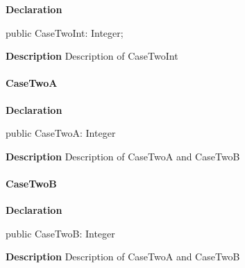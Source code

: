 \documentclass{report}
\begin{document}
\begin{list}{}{
\setlength{\itemindent}{0cm}
\setlength{\listparindent}{0cm}
\setlength{\leftmargin}{\evensidemargin}
\addtolength{\leftmargin}{\tmplength}
\settowidth{\labelsep}{X}
\addtolength{\leftmargin}{\labelsep}
\setlength{\labelwidth}{\tmplength}
}
\begin{flushleft}
\item[\textbf{Declaration}\hfill]
\begin{ttfamily}
public CaseTwoInt: Integer;\end{ttfamily}


\end{flushleft}
\par
\item[\textbf{Description}]
Description of CaseTwoInt

\end{list}
\paragraph*{CaseTwoA}\hspace*{\fill}

\begin{list}{}{
\setlength{\itemindent}{0cm}
\setlength{\listparindent}{0cm}
\setlength{\leftmargin}{\evensidemargin}
\addtolength{\leftmargin}{\tmplength}
\settowidth{\labelsep}{X}
\addtolength{\leftmargin}{\labelsep}
\setlength{\labelwidth}{\tmplength}
}
\begin{flushleft}
\item[\textbf{Declaration}\hfill]
\begin{ttfamily}
public CaseTwoA: Integer\end{ttfamily}


\end{flushleft}
\par
\item[\textbf{Description}]
Description of CaseTwoA and CaseTwoB

\end{list}
\paragraph*{CaseTwoB}\hspace*{\fill}

\begin{list}{}{
\setlength{\itemindent}{0cm}
\setlength{\listparindent}{0cm}
\setlength{\leftmargin}{\evensidemargin}
\addtolength{\leftmargin}{\tmplength}
\settowidth{\labelsep}{X}
\addtolength{\leftmargin}{\labelsep}
\setlength{\labelwidth}{\tmplength}
}
\begin{flushleft}
\item[\textbf{Declaration}\hfill]
\begin{ttfamily}
public CaseTwoB: Integer\end{ttfamily}


\end{flushleft}
\par
\item[\textbf{Description}]
Description of CaseTwoA and CaseTwoB

\end{list}
\end{document}
